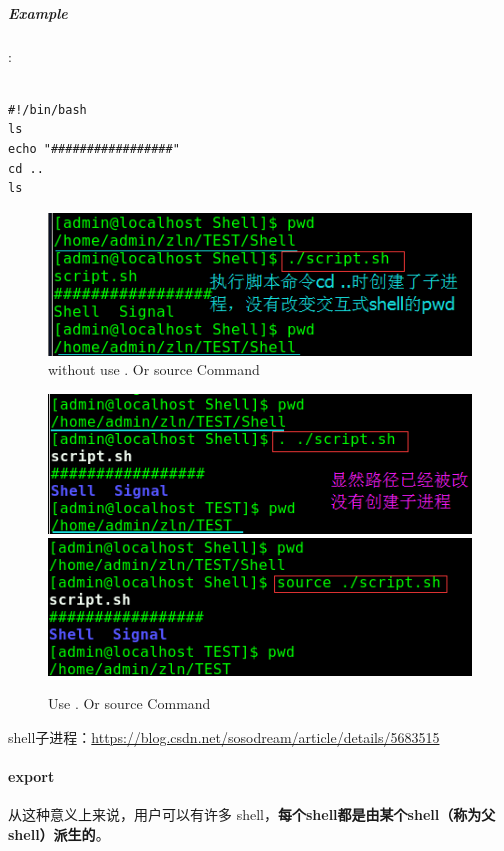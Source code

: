 \documentclass[UTF8,a4paper,12pt]{ctexbook}
\begin{document}
				 \subparagraph{Example}:
					 \begin{lstlisting}[frame=L,xleftmargin=.06\textwidth]

#!/bin/bash
ls
echo "#################"
cd ..
ls
					 \end{lstlisting}
					 \begin{figure}[h]
					 	\centering
					 	\includegraphics[scale = 0.5]{figure/SourceExample.png}
					 	\caption{without use . Or source Command}
					 \end{figure}
					 \begin{figure}[h]
					 	\begin{center}
					 		\includegraphics[scale = 0.5]{figure/SourceExample1.png}
					 		\includegraphics[scale = 0.5]{figure/SourceExample2.png}
					 	\end{center}
					 	\caption{Use . Or source Command}
					 \end{figure}
					 
				shell子进程：\url{https://blog.csdn.net/sosodream/article/details/5683515}
				
				
				\paragraph{export}
					从这种意义上来说，用户可以有许多 shell，\textbf{每个shell都是由某个shell（称为父shell）派生的}。
					
\end{document}
